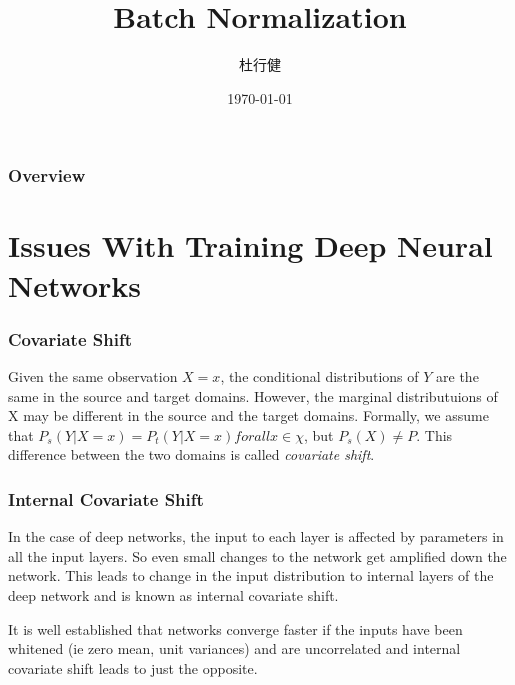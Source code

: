 




\title[BN]{Batch Normalization}
\author[杜行健]{杜行健}
\date{\today}



\begin{frame}
  \titlepage
\end{frame}

\begin{frame}[plain]
        \frametitle{Overview}
  \setcounter{tocdepth}{2}
  \tableofcontents
\end{frame}

\section{Issues With Training Deep Neural Networks}
\begin{frame}
    \frametitle{Covariate Shift}
        Given the same observation $X=x$, the conditional distributions of $Y$ are the same in the source and target domains. However, the marginal distributuions of X may be different in the source and the target domains. Formally, we assume that $P_s (Y|X=x) = P_t (Y|X = x) for all x \in \chi$, but $P_s (X) \neq P$. This difference between the two domains is called \textit{covariate shift}.\par
\end{frame}
\begin{frame}
        \frametitle{Internal Covariate Shift}
        In the case of deep networks, the input to each layer is affected by parameters in all the input layers. So even small changes to the network get amplified down the network. This leads to change in the input distribution to internal layers of the deep network and is known as internal covariate shift.\par
        It is well established that networks converge faster if the inputs have been whitened (ie zero mean, unit variances) and are uncorrelated and internal covariate shift leads to just the opposite.\par
\end{frame}

